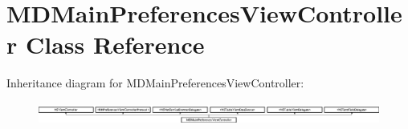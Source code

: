 \hypertarget{interface_m_d_main_preferences_view_controller}{\section{M\-D\-Main\-Preferences\-View\-Controller Class Reference}
\label{interface_m_d_main_preferences_view_controller}
}
Inheritance diagram for M\-D\-Main\-Preferences\-View\-Controller\-:\begin{figure}[H]
\begin{center}
\leavevmode
\includegraphics[height=0.740741cm]{interface_m_d_main_preferences_view_controller}
\end{center}
\end{figure}
